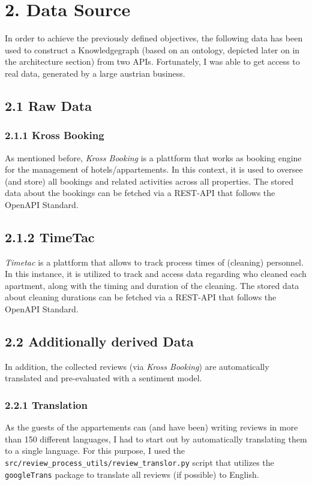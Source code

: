\documentclass[
]{article}
\begin{document}
\section{2. Data Source}\label{data-source}

In order to achieve the previously defined objectives, the following
data has been used to construct a Knowledgegraph (based on an ontology,
depicted later on in the architecture section) from two APIs. Fortunately,
I was able to get access to real data, generated by a large austrian business.

\subsection{2.1 Raw Data}\label{raw-data}

\subsubsection{2.1.1 Kross Booking}\label{kross-booking}

As mentioned before, {\textit{Kross Booking}} is a plattform that works as booking engine
for the management of hotels/appartements. In this context, it is used
to oversee (and store) all bookings and related activities across all
properties. The stored data about the bookings can be fetched via a
REST-API that follows the OpenAPI Standard.

\subsection{2.1.2 TimeTac}
\textit{Timetac} is a plattform that allows to track process times of (cleaning) personnel. In
this instance, it is utilized to track and access data regarding who
cleaned each apartment, along with the timing and duration of the
cleaning. The stored data about cleaning durations can be fetched via a
REST-API that follows the OpenAPI Standard.

\subsection{2.2 Additionally derived Data}\label{additionally-derived-data}
In addition, the collected reviews (via \emph{Kross Booking}) are
automatically translated and pre-evaluated with a sentiment model.\\


\subsubsection{2.2.1 Translation}
As the guests of the appartements can (and
have been) writing reviews in more than 150 different languages, I had
to start out by automatically translating them to a single language. For this purpose,
I used the \texttt{src/review\_process\_utils/review\_translor.py}
script that utilizes the \texttt{googleTrans} package to translate all
reviews (if possible) to English.
\end{document}
